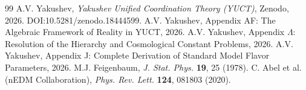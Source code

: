 \documentclass[12pt,a4paper]{article}
\begin{document}
	\newpage
	\begin{thebibliography}{99}
		 A.V. Yakushev, \textit{Yakushev Unified Coordination Theory (YUCT)}, Zenodo, 2026. DOI:10.5281/zenodo.18444599.
		 A.V. Yakushev, Appendix AF: The Algebraic Framework of Reality in YUCT, 2026.
		 A.V. Yakushev, Appendix \(\Lambda\): Resolution of the Hierarchy and Cosmological Constant Problems, 2026.
		 A.V. Yakushev, Appendix J: Complete Derivation of Standard Model Flavor Parameters, 2026.
		 M.J. Feigenbaum, \textit{J. Stat. Phys.} \textbf{19}, 25 (1978).
		 C. Abel et al. (nEDM Collaboration), \textit{Phys. Rev. Lett.} \textbf{124}, 081803 (2020).
	\end{thebibliography}
	
\end{document}
